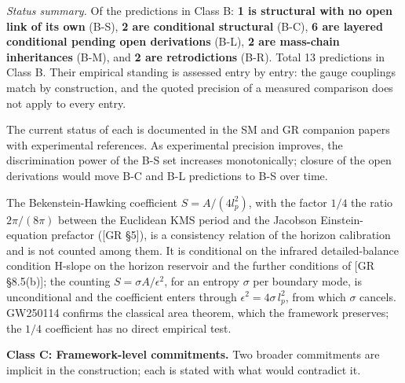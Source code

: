 \documentclass[
]{article}
\begin{document}
\emph{Status summary.} Of the predictions in Class B: \textbf{1 is
structural with no open link of its own} (B-S), \textbf{2 are
conditional structural} (B-C), \textbf{6 are layered conditional pending
open derivations} (B-L), \textbf{2 are mass-chain inheritances} (B-M),
and \textbf{2 are retrodictions} (B-R). Total 13 predictions in Class B.
Their empirical standing is assessed entry by entry: the gauge couplings
match by construction, and the quoted precision of a measured comparison
does not apply to every entry.

The current status of each is documented in the SM and GR companion
papers with experimental references. As experimental precision improves,
the discrimination power of the B-S set increases monotonically; closure
of the open derivations would move B-C and B-L predictions to B-S over
time.

The Bekenstein-Hawking coefficient \(S = A/(4 l_p^2)\), with the factor
\(1/4\) the ratio \(2\pi/(8\pi)\) between the Euclidean KMS period and
the Jacobson Einstein-equation prefactor ({[}GR §5{]}), is a consistency
relation of the horizon calibration and is not counted among them. It is
conditional on the infrared detailed-balance condition H-slope on the
horizon reservoir and the further conditions of {[}GR §8.5(b){]}; the
counting \(S = \sigma A/\epsilon^2\), for an entropy \(\sigma\) per
boundary mode, is unconditional and the coefficient enters through
\(\epsilon^2 = 4\sigma\,l_p^2\), from which \(\sigma\) cancels. GW250114
confirms the classical area theorem, which the framework preserves; the
\(1/4\) coefficient has no direct empirical test.

\textbf{Class C: Framework-level commitments.} Two broader commitments
are implicit in the construction; each is stated with what would
contradict it.
\end{document}

